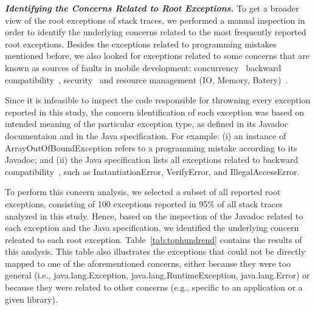 \documentclass[conference]{IEEEtran}
\begin{document}

\emph{\textbf{Identifying the Concerns Related to Root Exceptions.}} To get a broader view of the root exceptions of stack traces,
we performed a manual inspection in order to identify the underlying
concerns related to the most frequently reported root exceptions.
Besides the exceptions related to programming mistakes mentioned before, we also looked for exceptions related to some concerns that are known as sources of faults in mobile development: concurrency~\cite{ama2012} backward compatibility~\cite{McDon13}, security~\cite{enck2011study,was2010} and resource management (IO, Memory, Batery)~\cite{Zhang12}.

Since it is infeasible to inspect the code responsible for throwning every exception reported in this study,
the concern identification of each exception was based on intended
meaning of the particular exception type, as defined in 
its Javadoc documentaion and in the Java specification. 
For example: (i) an instance of ArrayOutOfBoundException  
refers to a programming mistake according to its Javadoc; and (ii) the Java specification lists all 
exceptions related to backward compatibility~\cite{javaback}, such as
InstantiationError, VerifyError, and IllegalAccessError.

To perform this concern analysis, we selected a subset of all reported
root exceptions, consisting of 100 exceptions
reported in 95\% of all stack traces analyzed in this study. Hence, based on the inspection of the 
Javadoc related to each exception and the Java specification, we
identified the underlying concern releated to each root exception. 
Table~\ref{tab:tophundrend} contains the results of this analysis. This table also illustrates the exceptions 
that could not be directly mapped to one of the aforementioned concerns, either because they were too general (i.e., java.lang.Exception,
java.lang.RuntimeException, java.lang.Error) or because they were
related to other concerns (e.g., specific to an application or a given library).
\end{document}
